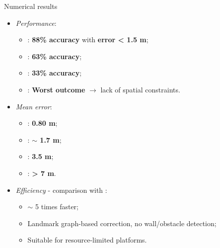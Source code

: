 \begin{frame}{Numerical results}
    \addtolength{\leftmargini}{\labelsep}
    \begin{itemize}
        \item \textit{Performance}:
            \begin{itemize}
                \item {}: \textbf{88\% accuracy} with \textbf{error < 1.5 m};
                \item {}: \textbf{63\% accuracy};
                \item {}: \textbf{33\% accuracy};
                \item {}: \textbf{Worst outcome} $\rightarrow$ lack of spatial constraints.
            \end{itemize}
        \item \textit{Mean error}:
            \begin{itemize}
                \item {}: \textbf{0.80 m};
                \item {}: \textbf{$\sim$ 1.7 m};
                \item {}: \textbf{3.5 m};
                \item {}: \textbf{> 7 m}.
            \end{itemize}
        \item \textit{Efficiency} - comparison with :
            \begin{itemize}
                \item $\sim$ 5 times faster;
                \item Landmark graph-based correction, no wall/obstacle detection;
                \item Suitable for resource-limited platforms.
            \end{itemize}
    \end{itemize}
\end{frame}